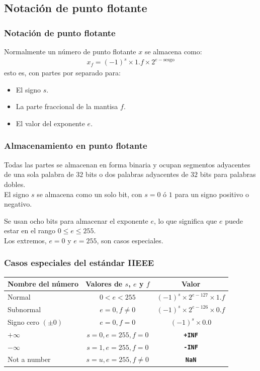 \documentclass[12pt]{beamer}
\begin{document}
 \subsection{Notación de punto flotante}

 \begin{frame}
 \frametitle{Notación de punto flotante}
 Normalmente un número de punto flotante $x$ se almacena como:
 \pause
 \begin{align}
 x_{f} = (-1)^{s} \times 1.f \times 2^{e - \text{sesgo}}
  \label{eq:ecuacion_01_02}
\end{align}
esto es, con partes por separado para:
\pause
 \begin{itemize}[<+->]
 \item[\ding{213}] El signo $s$.
 \item[\ding{213}] La parte fraccional de la mantisa $f$.
 \item[\ding{213}] El valor del exponente $e$.
\end{itemize}
\end{frame}
\begin{frame}
\frametitle{Almacenamiento en punto flotante}
Todas las partes se almacenan en forma binaria y ocupan segmentos adyacentes de una sola palabra de $32$ bits o dos palabras adyacentes de $32$ bits para palabras dobles.
\\
\bigskip
El signo $s$ se almacena como un solo bit, con $s = 0$ ó $1$ para un signo positivo o negativo.
\end{frame}
\begin{frame}
Se usan ocho bits para almacenar el exponente $e$, lo que significa que $e$ puede estar en el rango $0 \leq e \leq 255$.
\\
\bigskip
Los extremos, $e = 0$ y $e = 255$, son casos especiales.
\end{frame}
\begin{frame}
\frametitle{Casos especiales del estándar IIEEE}
\begin{table}
\fontsize{10}{10}\selectfont
\begin{tabular}{l c c}
\hline
Nombre del número & Valores de $s$, $e$ y $f$ & Valor \\ \hline
Normal & $0 < e < 255$ & $(-1)^{s} \times 2^{e-127} \times 1.f$ \\ \hline
Subnormal & $e = 0, f \neq 0$ & $(-1)^{s} \times 2^{e-126} \times 0.f$ \\ \hline
Signo cero $(\pm 0)$ & $e = 0, f = 0$ & $(-1)^{s} \times 0.0$ \\ \hline
$+ \infty$ & $s = 0, e=255, f = 0$ & \textbf{\texttt{+INF}} \\ \hline
$- \infty$ & $s = 1, e=255, f = 0$ & \textbf{\texttt{-INF}} \\ \hline
Not a number & $s = u, e=255, f \neq 0$ & \textbf{\texttt{NaN}} \\ \hline
\end{tabular}
\end{table}
\end{frame}
\end{document}
